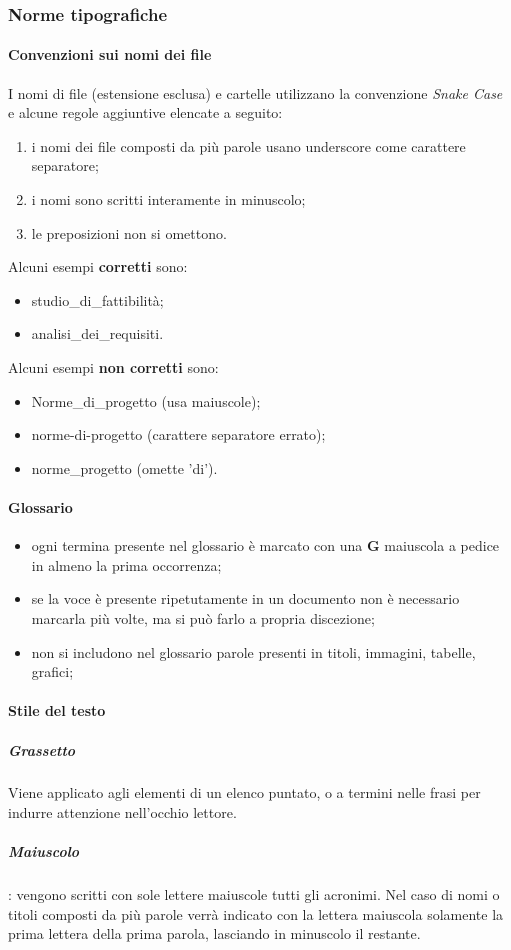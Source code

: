 	\subsubsection{Norme tipografiche}
		\paragraph{Convenzioni sui nomi dei file}
		I nomi di file (estensione esclusa) e cartelle utilizzano la convenzione \textit{Snake Case} e alcune regole aggiuntive elencate a seguito:
		\begin{enumerate}
			\item i nomi dei file composti da più parole usano underscore come carattere separatore;
			\item i nomi sono scritti interamente in minuscolo;
			\item le preposizioni non si omettono.
		\end{enumerate}
		Alcuni esempi \textbf{corretti} sono:
		\begin{itemize}
			\item studio\_di\_fattibilità;
			\item analisi\_dei\_requisiti.
		\end{itemize}	 	
		Alcuni esempi \textbf{non corretti} sono: 
		\begin{itemize}
			\item Norme\_di\_progetto (usa maiuscole);
			\item norme-di-progetto (carattere separatore errato);
			\item norme\_progetto (omette 'di').
		\end{itemize}
		\paragraph{Glossario}
		\begin{itemize}
			\item ogni termina presente nel glossario è marcato con una \textbf{G} maiuscola a pedice in almeno la prima occorrenza;
			\item se la voce è presente ripetutamente in un documento non è necessario marcarla più volte, ma si può farlo a propria discezione; 
			\item non si includono nel glossario parole presenti in titoli, immagini, tabelle, grafici;
		\end{itemize}			
		\paragraph{Stile del testo}
			\subparagraph{Grassetto}
			Viene applicato agli elementi di un elenco puntato, o a termini nelle frasi per indurre attenzione nell'occhio lettore.
			\subparagraph{Maiuscolo}: vengono scritti con sole lettere maiuscole tutti gli acronimi. Nel caso di nomi o titoli composti da più parole verrà indicato con la lettera maiuscola solamente la prima lettera della prima parola, lasciando in minuscolo il restante.	
